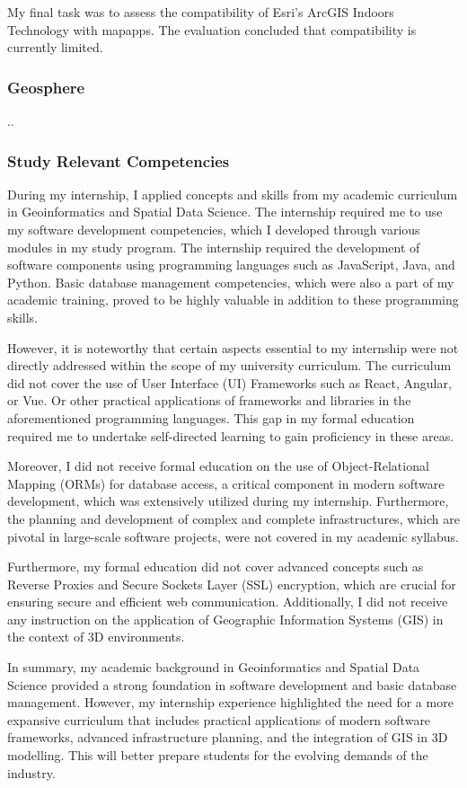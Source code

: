 \documentclass[11pt, titlepage, a4paper]{article}
\begin{document}
My final task was to assess the compatibility of Esri's ArcGIS Indoors Technology with mapapps. The evaluation concluded that compatibility is currently limited.
\subsubsection{Geosphere}
..



\subsubsection{Study Relevant Competencies}
During my internship, I applied concepts and skills from my academic curriculum in Geoinformatics and Spatial Data Science. The internship required me to use my software development competencies, which I developed through various modules in my study program. The internship required the development of software components using programming languages such as JavaScript, Java, and Python. Basic database management competencies, which were also a part of my academic training, proved to be highly valuable in addition to these programming skills.

However, it is noteworthy that certain aspects essential to my internship were not directly addressed within the scope of my university curriculum. The curriculum did not cover the use of User Interface (UI) Frameworks such as React, Angular, or Vue. Or other practical applications of frameworks and libraries in the aforementioned programming languages. This gap in my formal education required me to undertake self-directed learning to gain proficiency in these areas.

Moreover, I did not receive formal education on the use of Object-Relational Mapping (ORMs) for database access, a critical component in modern software development, which was extensively utilized during my internship. Furthermore, the planning and development of complex and complete infrastructures, which are pivotal in large-scale software projects, were not covered in my academic syllabus.

Furthermore, my formal education did not cover advanced concepts such as Reverse Proxies and Secure Sockets Layer (SSL) encryption, which are crucial for ensuring secure and efficient web communication. Additionally, I did not receive any instruction on the application of Geographic Information Systems (GIS) in the context of 3D environments.

In summary, my academic background in Geoinformatics and Spatial Data Science provided a strong foundation in software development and basic database management. However, my internship experience highlighted the need for a more expansive curriculum that includes practical applications of modern software frameworks, advanced infrastructure planning, and the integration of GIS in 3D modelling. This will better prepare students for the evolving demands of the industry.
\end{document}
